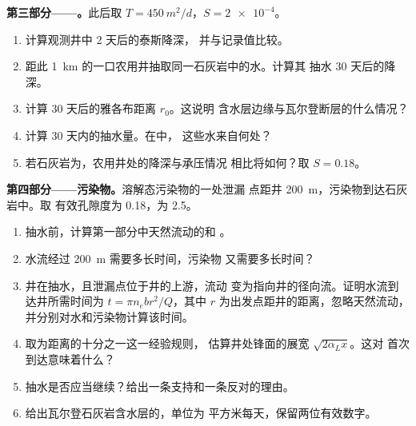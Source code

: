\begin{problem}
\medskip\noindent\textbf{第三部分——。}此后取 $T =
\qty{450}{m^2/d}$，$S = \num{2e-4}$。
\begin{enumerate}[resume]
\item 计算观测井中 2 天后的泰斯降深，
  并与记录值比较。
\item 距此 \qty{1}{km} 的一口农用井抽取同一石灰岩中的水。计算其
  抽水 30 天后的降深。
\item 计算 30 天后的雅各布距离 $r_0$。这说明
  含水层边缘与瓦尔登断层的什么情况？
\item 计算 30 天内的抽水量。在中，
  这些水来自何处？
\item 若石灰岩为，农用井处的降深与承压情况
  相比将如何？取 $S = 0.18$。
\end{enumerate}

\medskip\noindent\textbf{第四部分——污染物。}溶解态污染物的一处泄漏
点距井 \qty{200}{m}，污染物到达石灰岩中。取
有效孔隙度为 0.18，为 2.5。
\begin{enumerate}[resume]
\item 抽水前，计算第一部分中天然流动的和
  。
\item 水流经过 \qty{200}{m} 需要多长时间，污染物
  又需要多长时间？
\item 井在抽水，且泄漏点位于井的上游，流动
  变为指向井的径向流。证明水流到达井所需时间为 $t = \pi n_e b
  r^2/Q$，其中 $r$ 为出发点距井的距离，忽略天然流动，
  并分别对水和污染物计算该时间。
\item 取为距离的十分之一这一经验规则，
  估算井处锋面的展宽 $\sqrt{2\alpha_Lx}$。这对
  首次到达意味着什么？
\item 抽水是否应当继续？给出一条支持和一条反对的理由。
\item 给出瓦尔登石灰岩含水层的，单位为
  平方米每天，保留两位有效数字。
\end{enumerate}
\end{problem}
